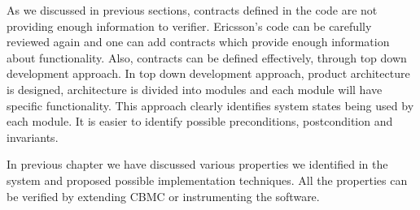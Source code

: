 As we discussed in previous sections, contracts defined in the code are not providing enough information to verifier. Ericsson's code can be carefully reviewed again and one can add contracts which provide enough information about functionality. Also, contracts can be defined effectively, through top down development approach. In top down development approach, product architecture is designed, architecture is divided into modules and each module will have specific functionality. This approach clearly identifies system states being used by each module. It is easier to identify possible preconditions, postcondition and invariants.

In previous chapter we have discussed various properties we identified in the system and proposed possible implementation techniques. All the properties can be verified by extending CBMC or instrumenting the software.





